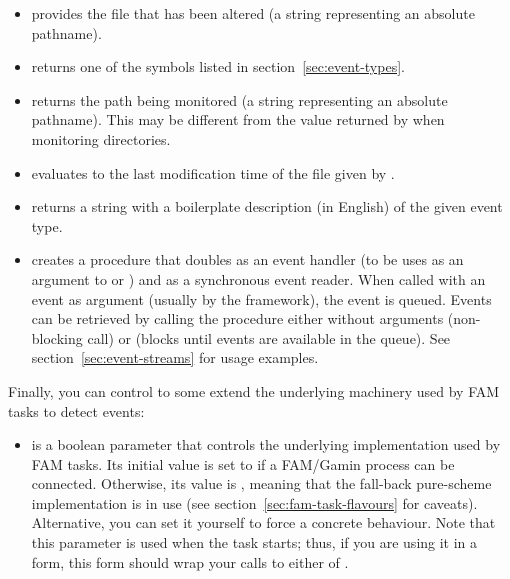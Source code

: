 \begin{itemize}
\item{} provides the file that has been
  altered (a string representing an absolute pathname).
\item{} returns one of the symbols listed in
  section~\ref{sec:event-types}.
\item{} returns the path being
  monitored (a string representing an absolute pathname). This may be
  different from the value returned by  when
  monitoring directories.
\item{} evaluates to the last
  modification time of the file given by .
\item{} returns a string with a
  boilerplate description (in English) of the given event type.
\item{} creates a procedure that doubles as
  an event handler (to be uses as an argument to 
  or ) and as a synchronous event reader. When
  called with an event as argument (usually by the framework), the
  event is queued. Events can be retrieved by calling the procedure
  either without arguments (non-blocking call) or  (blocks
  until events are available in the queue). See
  section~\ref{sec:event-streams} for usage examples.
\end{itemize}
Finally, you can control to some extend the underlying machinery used
by FAM tasks to detect events:
\begin{itemize}
\item{} is a boolean parameter that controls the
  underlying implementation used by FAM tasks. Its initial value is
  set to  if a FAM/Gamin process can be connected. Otherwise,
  its value is , meaning that the fall-back pure-scheme
  implementation is in use (see section~\ref{sec:fam-task-flavours}
  for caveats). Alternative, you can set it yourself to force a
  concrete behaviour. Note that this parameter is used when the task
  starts; thus, if you are using it in a  form, this
  form should wrap your calls to either  of
  .
\end{itemize}


